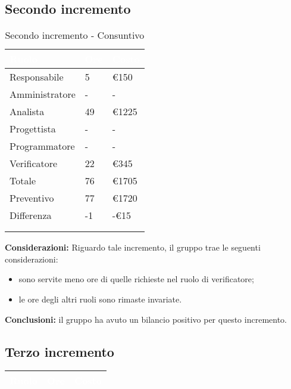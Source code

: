 {    \subsection{Secondo incremento}
    {
      \setlength{\freewidth}{\dimexpr\textwidth-30\tabcolsep}
      \renewcommand{\arraystretch}{1.0}
      \centering
      \setlength{\aboverulesep}{0pt}
      \setlength{\belowrulesep}{0pt}
      \begin{longtable}{C{.4\freewidth} C{.2\freewidth} C{.2\freewidth}}
      \toprule
      \textcolor{white}{\textbf{Ruolo}}&
      \textcolor{white}{\textbf{Ore}}&
      \textcolor{white}{\textbf{Costo}}\\
      \toprule
      \endhead

      Responsabile & 5 & €150 \\
      Amministratore & - & - \\
      Analista & 49 & €1225 \\
      Progettista & - & - \\
      Programmatore & - & - \\
      Verificatore & 22 & €345 \\
      Totale & 76 & €1705 \\
      Preventivo & 77 & €1720 \\
      Differenza & -1 & -€15 \\
      \bottomrule
      \\
      \caption{Secondo incremento - Consuntivo}

      \end{longtable} 
    
      \textbf{Considerazioni:} 
        Riguardo tale incremento, il gruppo trae le seguenti considerazioni:
        \begin{itemize}
            \item sono servite meno ore di quelle richieste nel ruolo di verificatore;
            \item le ore degli altri ruoli sono rimaste invariate.
        \end{itemize}

        \textbf{Conclusioni:} il gruppo ha avuto un bilancio positivo per questo incremento. 
    }

    \subsection{Terzo incremento}
    {
      \setlength{\freewidth}{\dimexpr\textwidth-30\tabcolsep}
      \renewcommand{\arraystretch}{1.0}
      \centering
      \setlength{\aboverulesep}{0pt}
      \setlength{\belowrulesep}{0pt}
      \begin{longtable}{C{.4\freewidth} C{.2\freewidth} C{.2\freewidth}}
      \toprule
      \textcolor{white}{\textbf{Ruolo}}&
      \textcolor{white}{\textbf{Ore}}&
      \textcolor{white}{\textbf{Costo}}\\
      \toprule
      \endhead


\end{longtable}}}
